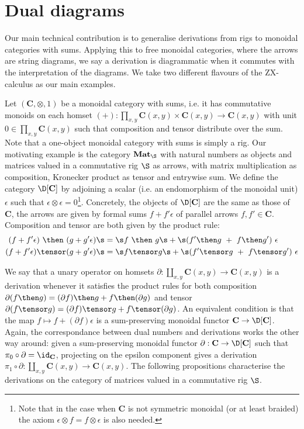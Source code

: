 
\section{Dual diagrams}\label{2-dual-diagrams}

Our main technical contribution is to generalise derivations from rigs to
monoidal categories with sums. Applying this to free monoidal categories,
where the arrows are string diagrams, we say a derivation is diagrammatic
when it commutes with the interpretation of the diagrams. We take two
different flavours of the ZX-calculus as our main examples.

Let $(\mathbf{C}, \otimes, 1)$ be a monoidal category with sums, i.e.
it has commutative monoids on each homset $(+) : \prod_{x,y}
\mathbf{C}(x, y) \times \mathbf{C}(x, y) \to \mathbf{C}(x, y)$
with unit $0 \in \prod_{x,y} \mathbf{C}(x, y)$
such that composition and tensor distribute over the sum.
Note that a one-object monoidal category with sums is simply a rig.
Our motivating example is the category $\mathbf{Mat}_\S$ with natural numbers
as objects and matrices valued in a commutative rig $\S$ as arrows, with matrix
multiplication as composition, Kronecker product as tensor and entrywise sum.
We define the category $\D[\mathbf{C}]$ by adjoining a scalar (i.e. an
endomorphism of the monoidal unit) $\epsilon$ such that $\epsilon \otimes \epsilon = 0$\footnote{
Note that in the case when $\mathbf{C}$ is not symmetric monoidal (or at least braided) the axiom $\epsilon \otimes f = f \otimes \epsilon$ is also needed.
}.
Concretely, the objects of $\D[\mathbf{C}]$ are the same as those of $\mathbf{C}$, the arrows
are given by formal sums $f + f' \epsilon$ of parallel arrows $f, f' \in \mathbf{C}$.
Composition and tensor are both given by the product rule:
\begin{align}
    (f + f' \epsilon) \ \then \ (g + g' \epsilon)
    &\s = \s f \ \then \ g \s + \s (f' \then g \ + \ f \then g') \ \epsilon\\
    (f + f' \epsilon) \tensor (g + g' \epsilon)
    &\s = \s f \tensor g \s + \s (f' \tensor g \ + \ f \tensor g') \ \epsilon
\end{align}

We say that a unary operator on homsets $\partial : \coprod_{x,y}
\mathbf{C}(x, y) \to \mathbf{C}(x, y)$ is a derivation whenever it satisfies the product rules for both composition
$\partial (f \then g) = (\partial f) \then g + f \then (\partial g)$
and tensor
$\partial (f \tensor g) = (\partial f) \tensor g + f \tensor (\partial g)$.
An equivalent condition is that the map $f \mapsto f + (\partial f) \epsilon$
is a sum-preserving monoidal functor $\mathbf{C} \to \D[\mathbf{C}]$.
Again, the correspondance between dual numbers and derivations works the other
way around: given a sum-preserving monoidal functor
$\partial : \mathbf{C} \to \D[\mathbf{C}]$ such that
$\pi_0 \circ \partial = \id_{\mathbf{C}}$, projecting on the epsilon component
gives a derivation $\pi_1 \circ \partial : \coprod_{x,y}
\mathbf{C}(x, y) \to \mathbf{C}(x, y)$. The following propositions characterise
the derivations on the category of matrices valued in a commutative rig $\S$.

